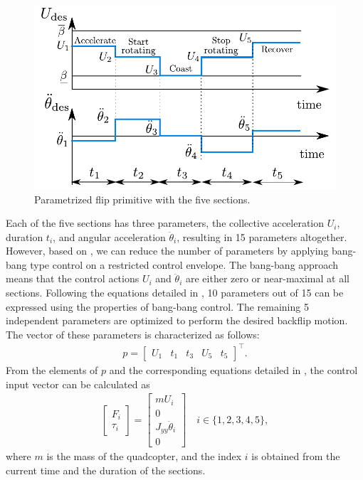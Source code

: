 \renewcommand{\baselinestretch}{1.15}\normalsize
\begin{figure}
\centering
\includegraphics[scale=.7]{Fig/sections2.pdf}
\caption{Parametrized flip primitive with the five sections.}\label{fig:sections}
\end{figure}
Each of the five sections has three parameters, the collective acceleration $U_i$, duration $t_i$, and angular acceleration $\ddot{\theta}_i$, resulting in 15 parameters altogether. However, based on \cite{LSICRA2010}, we can reduce the number of parameters by applying bang-bang type control on a restricted control envelope. The bang-bang approach means that the control actions $U_i$ and $\ddot\theta_i$ are either zero or near-maximal at all sections. Following the equations detailed in \cite{LSICRA2010}, 10 parameters out of 15 can be expressed using the properties of bang-bang control. The remaining 5 independent parameters are optimized to perform the desired backflip motion. The vector of these parameters is characterized as follows:
\begin{align}
p=\begin{bmatrix}\label{eq:openparams}
U_1 & t_1 & t_3 & U_5& t_5
\end{bmatrix} ^\top.
\end{align} 
From the elements of $p$ and the corresponding equations detailed in \cite{LSICRA2010}, the control input vector can be calculated as
 \begin{align}\label{eq:openinp}
    \begin{bmatrix}
        F_i \\ \tau_i
    \end{bmatrix}=\begin{bmatrix}
        mU_i \\ 0 \\ J_{yy}\ddot{\theta}_i \\ 0
    \end{bmatrix}\quad i\in\{1,2,3,4,5\},
\end{align}   
where $m$ is the mass of the quadcopter, and the index $i$ is obtained from the current time and the duration of the sections.

